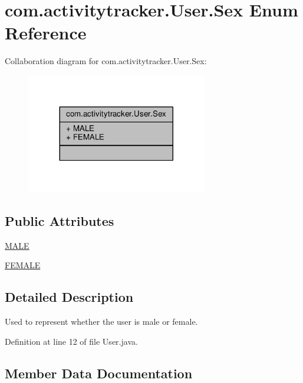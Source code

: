 \hypertarget{enumcom_1_1activitytracker_1_1_user_1_1_sex}{}\section{com.\+activitytracker.\+User.\+Sex Enum Reference}
\label{enumcom_1_1activitytracker_1_1_user_1_1_sex}


Collaboration diagram for com.\+activitytracker.\+User.\+Sex\+:
\nopagebreak
\begin{figure}[H]
\begin{center}
\leavevmode
\includegraphics[width=224pt]{enumcom_1_1activitytracker_1_1_user_1_1_sex__coll__graph}
\end{center}
\end{figure}
\subsection*{Public Attributes}
\begin{DoxyCompactItemize}
\item 
\hyperlink{enumcom_1_1activitytracker_1_1_user_1_1_sex_ad3b626a38bd4615eb621d75b939f412d}{M\+A\+LE}
\item 
\hyperlink{enumcom_1_1activitytracker_1_1_user_1_1_sex_a5c22ece8a4df71ed5202cd492990a752}{F\+E\+M\+A\+LE}
\end{DoxyCompactItemize}


\subsection{Detailed Description}
Used to represent whether the user is male or female. 

Definition at line 12 of file User.\+java.



\subsection{Member Data Documentation}
